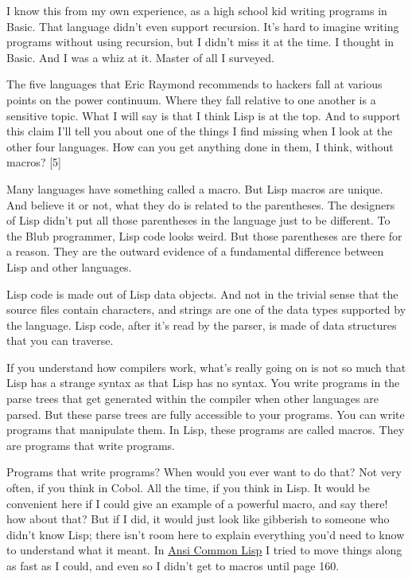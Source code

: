 I know this from my own experience, as a high school kid writing
programs in Basic. That language didn't even support recursion. It's
hard to imagine writing programs without using recursion, but I didn't
miss it at the time. I thought in Basic. And I was a whiz at it. Master
of all I surveyed.

The five languages that Eric Raymond recommends to hackers fall at
various points on the power continuum. Where they fall relative to one
another is a sensitive topic. What I will say is that I think Lisp is at
the top. And to support this claim I'll tell you about one of the things
I find missing when I look at the other four languages. How can you get
anything done in them, I think, without macros? {[}5{]}

Many languages have something called a macro. But Lisp macros are
unique. And believe it or not, what they do is related to the
parentheses. The designers of Lisp didn't put all those parentheses in
the language just to be different. To the Blub programmer, Lisp code
looks weird. But those parentheses are there for a reason. They are the
outward evidence of a fundamental difference between Lisp and other
languages.

Lisp code is made out of Lisp data objects. And not in the trivial sense
that the source files contain characters, and strings are one of the
data types supported by the language. Lisp code, after it's read by the
parser, is made of data structures that you can traverse.

If you understand how compilers work, what's really going on is not so
much that Lisp has a strange syntax as that Lisp has no syntax. You
write programs in the parse trees that get generated within the compiler
when other languages are parsed. But these parse trees are fully
accessible to your programs. You can write programs that manipulate
them. In Lisp, these programs are called macros. They are programs that
write programs.

Programs that write programs? When would you ever want to do that? Not
very often, if you think in Cobol. All the time, if you think in Lisp.
It would be convenient here if I could give an example of a powerful
macro, and say there! how about that? But if I did, it would just look
like gibberish to someone who didn't know Lisp; there isn't room here to
explain everything you'd need to know to understand what it meant. In
\href{acl.html}{Ansi Common Lisp} I tried to move things along as fast
as I could, and even so I didn't get to macros until page 160.

